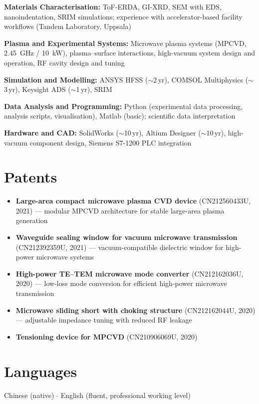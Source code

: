 \documentclass[a4paper,11pt]{article}
\begin{document}
\noindent\textbf{Materials Characterisation:}
ToF-ERDA, GI-XRD, SEM with EDS, nanoindentation, SRIM simulations;
experience with accelerator-based facility workflows (Tandem Laboratory, Uppsala)

\smallskip
\noindent\textbf{Plasma and Experimental Systems:}
Microwave plasma systems (MPCVD, 2.45~GHz / 10~kW), plasma--surface interactions,
high-vacuum system design and operation, RF cavity design and tuning

\smallskip
\noindent\textbf{Simulation and Modelling:}
ANSYS HFSS ($\sim$2\,yr), COMSOL Multiphysics ($\sim$3\,yr), Keysight ADS ($\sim$1\,yr),
SRIM

\smallskip
\noindent\textbf{Data Analysis and Programming:}
Python (experimental data processing, analysis scripts, visualisation),
Matlab (basic); scientific data interpretation

\smallskip
\noindent\textbf{Hardware and CAD:}
SolidWorks ($\sim$10\,yr), Altium Designer ($\sim$10\,yr),
high-vacuum component design, Siemens S7-1200 PLC integration

\section*{Patents}

\begin{itemize}[noitemsep, topsep=2pt, leftmargin=*]
    \item \textbf{Large-area compact microwave plasma CVD device}
          (CN212560433U, 2021) ---
          modular MPCVD architecture for stable large-area plasma generation
    \item \textbf{Waveguide sealing window for vacuum microwave transmission}
          (CN212392359U, 2021) ---
          vacuum-compatible dielectric window for high-power microwave systems
    \item \textbf{High-power TE--TEM microwave mode converter}
          (CN212162036U, 2020) ---
          low-loss mode conversion for efficient high-power microwave transmission
    \item \textbf{Microwave sliding short with choking structure}
          (CN212162044U, 2020) ---
          adjustable impedance tuning with reduced RF leakage
    \item \textbf{Tensioning device for MPCVD} (CN210906069U, 2020)
\end{itemize}

\section*{Languages}

Chinese (native) \enspace $\cdot$ \enspace English (fluent, professional working level)
\end{document}
